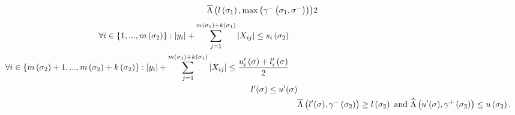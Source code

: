 \begin{lemma}
\begin{align}
\begin{split}
{\overline{\Lambda}\left(l\left(\sigma_{1}\right),\max\left(\gamma^-\left(\sigma_{1},\sigma^-\right)\right)\right)}{2}
\end{split}
\end{align}
\begin{align}
\begin{split}
& \forall i\in \{1,...,m\left(\sigma_{2}\right)\}:
 \left|y_i\right|+\sum_{j=1}^{m\left(\sigma_{1}\right)+k\left(\sigma_{1}\right)}\left|X_{ij}\right|\leq s_i\left(\sigma_{2}\right)
\end{split}\\
\begin{split}
& \forall i\in
\left\{m\left(\sigma_{2}\right)+1,...,m\left(\sigma_{2}\right)+k\left(\sigma_{2}\right)\right\}:
\left|y_i\right|+\sum_{j=1}^{m\left(\sigma_{1}\right)+k\left(\sigma_{1}\right)}\left|X_{ij}\right|\leq \frac{u^\prime_i\left(\sigma\right)+l^\prime_i\left(\sigma\right)}{2}
\end{split}\\
\begin{split}
l^\prime(\sigma)\leq u^\prime(\sigma)
\end{split}\\
& \overline{\Lambda}\left(l^\prime(\sigma),\gamma^-\left(\sigma_{2}\right)\right)\geq
l\left(\sigma_{2}\right)~\text{and}~\widehat{\Lambda}\left(u^\prime(\sigma),\gamma^+\left(\sigma_{2}\right)\right)\leq u\left(\sigma_{2}\right).
\end{align}
\end{lemma}